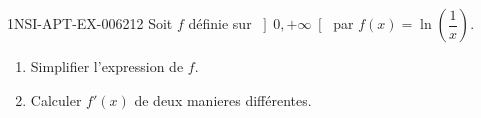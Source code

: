 \begin{exercice}{1NSI-APT-EX-006}{2}{12}
Soit $f$ définie sur $\left]0, +\infty\right[$ par $f(x) = \ln\!\left(\dfrac{1}{x}\right)$.
\begin{enumerate}
  \item Simplifier l'expression de $f$.
  \item Calculer $f'(x)$ de deux manieres différentes.
\end{enumerate}

\end{exercice}
